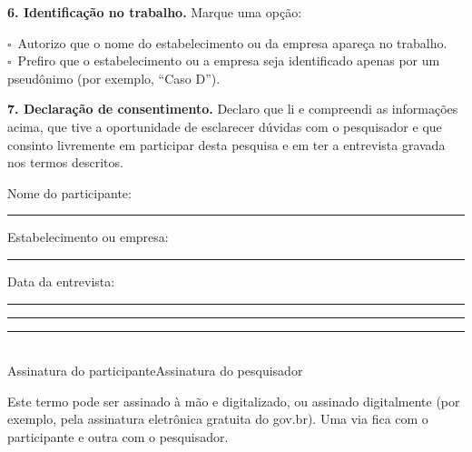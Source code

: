 \documentclass[11pt,a4paper]{article}
\newcommand{\caixa}{$\square$\ }
\newcommand{\campo}[1]{\rule{#1}{0.4pt}}
\begin{document}
\textbf{6. Identificação no trabalho.} Marque uma opção:

\caixa Autorizo que o nome do estabelecimento ou da empresa apareça no trabalho.\\
\caixa Prefiro que o estabelecimento ou a empresa seja identificado apenas por um pseudônimo (por exemplo, ``Caso D'').

\textbf{7. Declaração de consentimento.} Declaro que li e compreendi as informações acima, que tive a oportunidade de esclarecer dúvidas com o pesquisador e que consinto livremente em participar desta pesquisa e em ter a entrevista gravada nos termos descritos.

\vspace{1.2em}
Nome do participante: \campo{10.5cm}

Estabelecimento ou empresa: \campo{9.6cm}\qquad

Data da entrevista: \campo{4cm}

\vspace{2.5em}
\campo{7.2cm}\hfill\campo{7.2cm}\\
Assinatura do participante\hfill Assinatura do pesquisador

\vfill
{\small Este termo pode ser assinado à mão e digitalizado, ou assinado digitalmente (por exemplo, pela assinatura eletrônica gratuita do gov.br). Uma via fica com o participante e outra com o pesquisador.}
\end{document}
